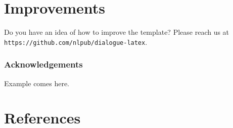 \documentclass{dialogue}
\begin{document}
\section{Improvements}

Do you have an idea of how to improve the template? Please reach us at\\\texttt{https://github.com/nlpub/dialogue-latex}.

\subsubsection*{Acknowledgements}

Example comes here.

\color{blue}\section*{References}

\makeatletter
\renewcommand{\section}{\@gobbletwo}
\makeatother

\end{document}
